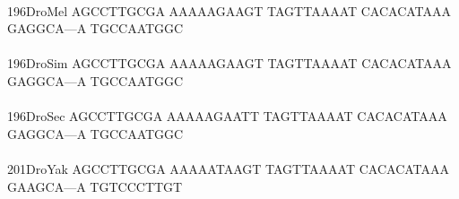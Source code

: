 \documentclass[11pt,twoside,reqno,a4paper]{article}
\begin{document}
{\\
196\hspace*{1\charwidth}DroMel	AGCCTTGCGA	AAAAAGAAGT	TAGTTAAAAT	CACACATAAA	GAGGCA---A	TGCCAATGGC	\\
\hspace*{4\charwidth}\hspace*{7\charwidth}\hspace*{1\charwidth}\hspace*{1\charwidth}\hspace*{1\charwidth}\hspace*{1\charwidth}\hspace*{1\charwidth}\hspace*{1\charwidth}\\
196\hspace*{1\charwidth}DroSim	AGCCTTGCGA	AAAAAGAAGT	TAGTTAAAAT	CACACATAAA	GAGGCA---A	TGCCAATGGC	\\
\hspace*{4\charwidth}\hspace*{7\charwidth}\hspace*{1\charwidth}\hspace*{1\charwidth}\hspace*{1\charwidth}\hspace*{1\charwidth}\hspace*{1\charwidth}\hspace*{1\charwidth}\\
196\hspace*{1\charwidth}DroSec	AGCCTTGCGA	AAAAAGAATT	TAGTTAAAAT	CACACATAAA	GAGGCA---A	TGCCAATGGC	\\
\hspace*{4\charwidth}\hspace*{7\charwidth}\hspace*{1\charwidth}\hspace*{1\charwidth}\hspace*{1\charwidth}\hspace*{1\charwidth}\hspace*{1\charwidth}\hspace*{1\charwidth}\\
201\hspace*{1\charwidth}DroYak	AGCCTTGCGA	AAAAATAAGT	TAGTTAAAAT	CACACATAAA	GAAGCA---A	TGTCCCTTGT	\\
\hspace*{4\charwidth}\hspace*{7\charwidth}\hspace*{1\charwidth}\hspace*{1\charwidth}\hspace*{1\charwidth}\hspace*{1\charwidth}\hspace*{1\charwidth}\hspace*{1\charwidth}\\
}
\end{document}
